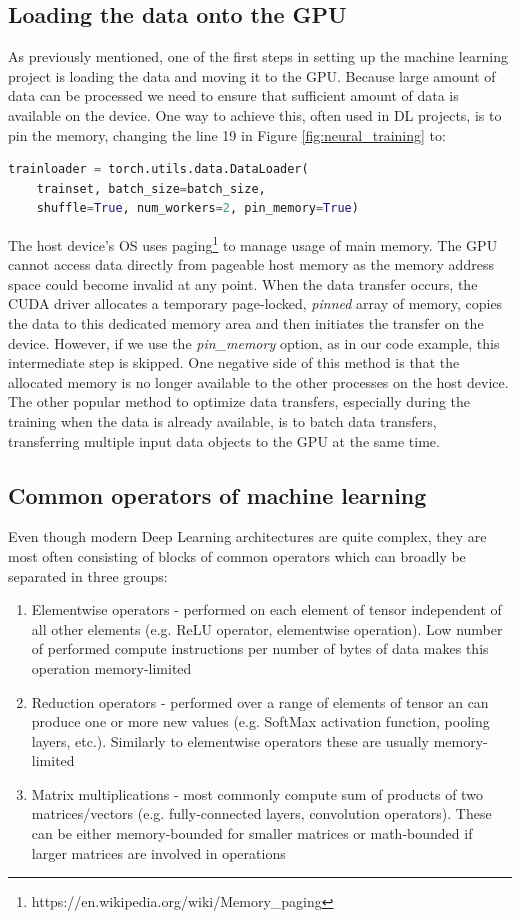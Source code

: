 \documentclass{article}
\begin{document}
\subsection{Loading the data onto the GPU}
As previously mentioned, one of the first steps in setting up the machine learning project is loading the data and moving it to the GPU.
Because large amount of data can be processed we need to ensure that sufficient amount of data is
available on the device.
One way to achieve this, often used in DL projects, is to pin the memory, changing the line 19 in Figure \ref{fig:neural_training} to:
\begin{lstlisting}[language=Python]
trainloader = torch.utils.data.DataLoader(
    trainset, batch_size=batch_size,
    shuffle=True, num_workers=2, pin_memory=True)
\end{lstlisting}
The host device's OS uses paging\footnote{https://en.wikipedia.org/wiki/Memory\_paging} to manage usage of main memory. 
The GPU cannot access data directly from pageable host memory as the memory address space could become invalid at any point.
When the data transfer occurs, the CUDA driver allocates a temporary page-locked, \textit{pinned} array of memory, copies the data to this dedicated memory area and then initiates the transfer on
the device.
However, if we use the \textit{pin\_memory} option, as in our code example, this intermediate step is skipped.
One negative side of this method is that the allocated memory is no longer available to the other processes on the host device.
The other popular method to optimize data transfers, especially during the training when the data is already available, is to batch data transfers, transferring multiple input data objects to the GPU at the same time.
\subsection{Common operators of machine learning}
Even though modern Deep Learning architectures are quite complex, they are most often consisting of blocks of common
operators which can broadly be separated in three groups:
\begin{enumerate}

\item  Elementwise operators - performed on each element of tensor independent of all other elements (e.g. ReLU operator, elementwise operation). Low number of performed compute instructions per number of bytes of data makes this operation memory-limited
\item  Reduction operators - performed over a range of elements of tensor an can produce one or more new values (e.g. SoftMax activation function, pooling layers, etc.). Similarly to elementwise operators these are usually memory-limited 
\item  Matrix multiplications - most commonly compute sum of products of two matrices/vectors (e.g. fully-connected layers, convolution operators). These can be either memory-bounded for smaller matrices or math-bounded if larger matrices are involved in operations

\end{enumerate}
\end{document}
